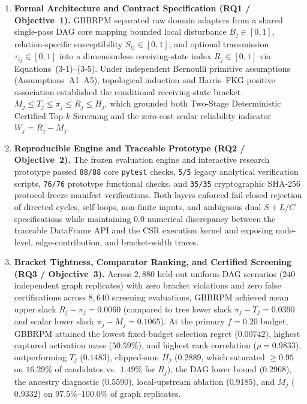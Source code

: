 \begin{enumerate}[label=\arabic*.,leftmargin=*]
\item \textbf{Formal Architecture and Contract Specification (RQ1 /
Objective~1).} GBBRPM separated raw domain adapters from a shared
single-pass DAG core mapping bounded local disturbance $B_j \in [0,1]$,
relation-specific susceptibility $S_{ij} \in [0,1]$, and optional
transmission $\tau_{ij} \in [0,1]$ into a dimensionless receiving-state
index $R_j \in [0,1]$ via Equations~(3-1)--(3-5). Under independent
Bernoulli primitive assumptions (Assumptions~A1--A5), topological
induction and Harris--FKG positive association established the
conditional receiving-state bracket
$M_j \le T_j \le \pi_j \le R_j \le H_j$, which grounded both Two-Stage
Deterministic Certified Top-$k$ Screening and the zero-cost scalar
reliability indicator $W_j = R_j - M_j$.
\item \textbf{Reproducible Engine and Traceable Prototype (RQ2 /
Objective~2).} The frozen evaluation engine and interactive research
prototype passed \texttt{88/88} core \texttt{pytest} checks,
\texttt{5/5} legacy analytical verification scripts, \texttt{76/76}
prototype functional checks, and \texttt{35/35} cryptographic SHA-256
protocol-freeze manifest verifications. Both layers enforced
fail-closed rejection of directed cycles, self-loops, non-finite inputs,
and ambiguous dual $S+L/C$ specifications while maintaining $0.0$
numerical discrepancy between the traceable DataFrame API and the CSR
execution kernel and exposing node-level, edge-contribution, and
bracket-width traces.
\item \textbf{Bracket Tightness, Comparator Ranking, and Certified
Screening (RQ3 / Objective~3).} Across $2,880$ held-out uniform-DAG
scenarios ($240$ independent graph replicates) with zero bracket
violations and zero false certifications across $8,640$ screening
evaluations, GBBRPM achieved mean upper slack $R_j - \pi_j = 0.0060$
(compared to tree lower slack $\pi_j - T_j = 0.0390$ and scalar lower
slack $\pi_j - M_j = 0.1065$). At the primary $f=0.20$ budget, GBBRPM
attained the lowest fixed-budget selection regret ($0.00742$), highest
captured activation mass ($50.59\%$), and highest rank correlation
($\rho = 0.9833$), outperforming $T_j$ ($0.1483$), clipped-sum $H_j$
($0.2889$, which saturated $\ge 0.95$ on $16.29\%$ of candidates vs.\
$1.49\%$ for $R_j$), the \citet{abbe2020} DAG lower bound ($0.2968$),
the ancestry diagnostic ($0.5590$), local-upstream ablation ($0.9185$),
and $M_j$ ($0.9332$) on $97.5\%$--$100.0\%$ of graph replicates.

\end{enumerate}
